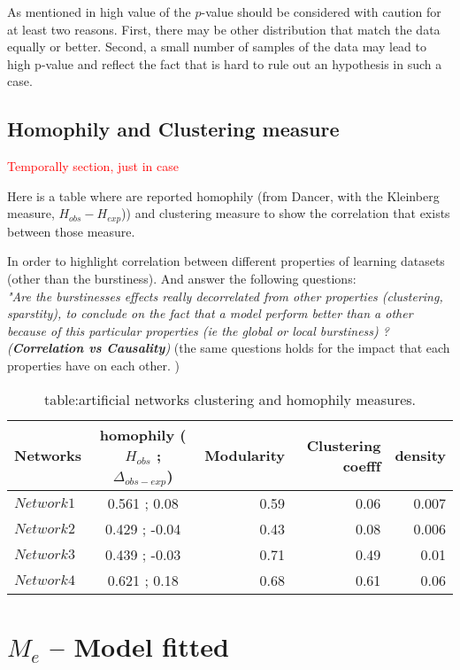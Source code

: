 \documentclass[a4paper, 12pt]{article}
\begin{document}
As mentioned in \cite{clauset2009power} high value of the $p$-value should be considered with caution for at least two reasons. First, there may be other distribution that match the data equally or better. Second, a small number of samples of the data may lead to high p-value and reflect the fact that is hard to rule out an hypothesis in such a case.

\subsection{Homophily and Clustering measure}
\textcolor{red}{Temporally section, just in case}

Here is a  table where are reported homophily (from Dancer, with the Kleinberg measure, $H_{obs} - H_{exp}$)) and clustering measure to show the correlation that exists between those measure. 

In order to highlight correlation between different properties of learning datasets (other than the burstiness). And answer the following questions: ~\\

\hspace{1cm}\textit{"Are the burstinesses effects really decorrelated from other properties (clustering, sparstity), to conclude on the fact that a model perform better than a other because of this particular properties (ie the global or local burstiness) ? (\textbf{Correlation \emph{vs} Causality}) } (the same questions holds for the impact that each properties have on each other. ) 

\begin{table}[h] \label{table:artificial_networks_hom}
\centering
	\caption{table:artificial networks clustering and homophily measures.}
	\begin{tabular}{lcrrr}
		\hline
		Networks   &  homophily ($H_ {obs}$ ; $\Delta_{obs - exp}$)    &  Modularity & Clustering coefff & density   \\
		\hline
		$Network1$  & 0.561 ;  0.08  &0.59  & 0.06 & 0.007  \\
		$Network2$  & 0.429 ; -0.04  &0.43  & 0.08 & 0.006 \\
		$Network3$  & 0.439 ; -0.03  &0.71  & 0.49 & 0.01 \\
		$Network4$  & 0.621 ;  0.18  &0.68  & 0.61 & 0.06 \\
		\hline
	\end{tabular}
\end{table}

\section{$M_e$ -- Model fitted}
\end{document}
